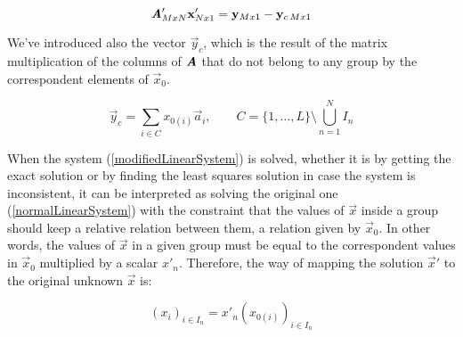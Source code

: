\begin{equation}
\bm{\mathit{A}}'_{MxN} \mathbf{x}'_{Nx1} = \mathbf{y}_{Mx1} - \mathbf{y}_{c \, Mx1}
\label{modifiedLinearSystem}
\end{equation}

We've introduced also the vector $\vec{y}_c$, which is the result of the matrix multiplication of the columns of $\bm{\mathit{A}}$ that do not belong to any group by the correspondent elements of $\vec{x}_0$.

\begin{equation}
\vec{y}_c = \sum_{i \in C} x_{0(i)} \vec{a}_i , \qquad
C = \{1, \ldots, L\} \setminus \bigcup_{n=1}^N I_n
\end{equation}

When the system (\autoref{modifiedLinearSystem}) is solved, whether it is by getting the exact solution or by finding the least squares solution in case the system is inconsistent, it can be interpreted as solving the original one (\autoref{normalLinearSystem}) with the constraint that the values of $\vec{x}$ inside a group should keep a relative relation between them, a relation given by $\vec{x}_0$. In other words, the values of $\vec{x}$ in a given group must be equal to the correspondent values in $\vec{x}_0$ multiplied by a scalar $x'_n$. Therefore, the way of mapping the solution $\vec{x}'$ to the original unknown $\vec{x}$ is:

\begin{equation}
(x_i)_{i \in I_n} = x'_n (x_{0(i)})_{i \in I_n}
\end{equation}

